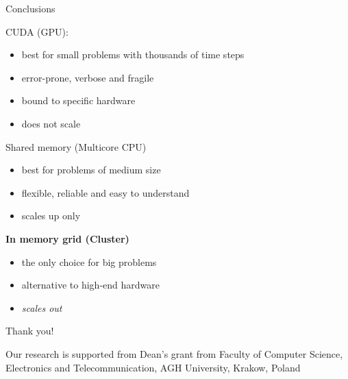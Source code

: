 \documentclass[c]{beamer}
\begin{document}
\begin{frame}{Conclusions}

CUDA (GPU):
\begin{itemize}
  \item best for small problems with thousands of time steps
  \item error-prone, verbose and fragile
  \item bound to specific hardware
  \item does not scale
\end{itemize}

\vskip 0.1in

Shared memory (Multicore CPU)
\begin{itemize}
  \item best for problems of medium size
  \item flexible, reliable and easy to understand
  \item scales up only
\end{itemize}

\vskip 0.1in

\textbf{In memory grid (Cluster)}
\begin{itemize}
  \item the only choice for big problems
  \item alternative to high-end hardware
  \item \emph{scales out}
\end{itemize}

\end{frame}


\begin{frame}{Thank you!}


Our research is supported from Dean's grant from Faculty of Computer Science, Electronics and Telecommunication, AGH University, Krakow, Poland

\end{frame}

\end{document}
